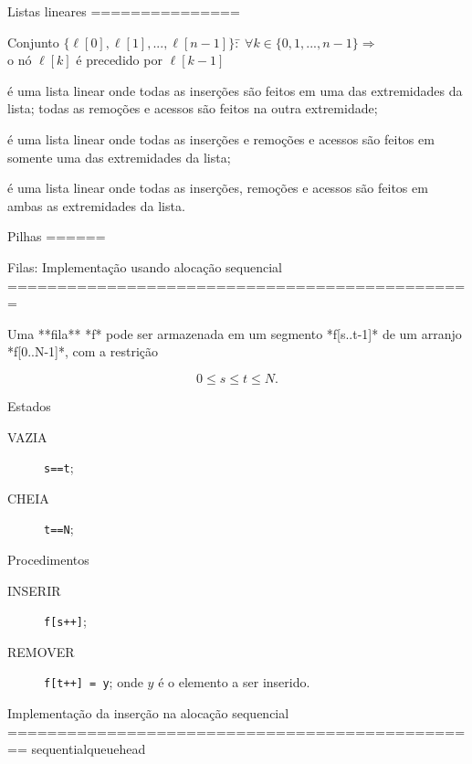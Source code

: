 
Listas lineares
===============

\begin{definition}
\begin{tabbing}
Conjunto $\{\ell[0], \ell[1],...,\ell[n-1]\} :$\= $\forall k \in
\{0, 1,..., n-1\} \Rightarrow$\\
 \> o nó $\ell[k]$ é precedido por $\ell[k-1]$\\
\end{tabbing}
\end{definition}

\begin{description}[<+-| alert@+>]
\item[Fila] é uma lista linear onde todas as inserções
são feitos em uma das extremidades da lista; todas as remoções e
acessos são feitos na outra extremidade;
\item[Pilha] é uma lista linear onde todas as inserções
e remoções e acessos são feitos em somente uma das extremidades da
lista;
\item[Deque] é uma lista linear onde todas as inserções,
remoções e acessos são feitos em ambas as extremidades da lista.
\end{description}


Pilhas
======

Filas: Implementação usando alocação sequencial
===============================================

Uma **fila** *f* pode ser armazenada em um segmento *f[s..t-1]* de um
arranjo *f[0..N-1]*, com a restrição

$$0\leq s\leq t \leq N. $$

\pause

Estados

\begin{description}
\item[VAZIA] {\tt s==t};
\item[CHEIA] {\tt t==N};
\end{description}

\pause

Procedimentos

\begin{description}
\item[INSERIR] {\tt f[s++]};
\item[REMOVER] {\tt f[t++] = y}; onde $y$ é o elemento a ser inserido.
\end{description}


Implementação da inserção na alocação sequencial
================================================
sequentialqueuehead

